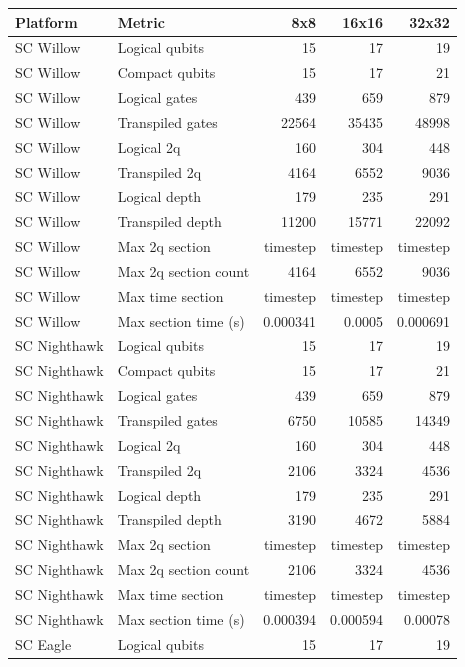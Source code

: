 \begin{table}
\centering
\scriptsize
\begin{tabular}{llrrr}
\hline
Platform & Metric & 8x8 & 16x16 & 32x32 \\
\hline
SC Willow & Logical qubits & 15 & 17 & 19 \\
SC Willow & Compact qubits & 15 & 17 & 21 \\
SC Willow & Logical gates & 439 & 659 & 879 \\
SC Willow & Transpiled gates & 22564 & 35435 & 48998 \\
SC Willow & Logical 2q & 160 & 304 & 448 \\
SC Willow & Transpiled 2q & 4164 & 6552 & 9036 \\
SC Willow & Logical depth & 179 & 235 & 291 \\
SC Willow & Transpiled depth & 11200 & 15771 & 22092 \\
SC Willow & Max 2q section & timestep & timestep & timestep \\
SC Willow & Max 2q section count & 4164 & 6552 & 9036 \\
SC Willow & Max time section & timestep & timestep & timestep \\
SC Willow & Max section time (s) & 0.000341 & 0.0005 & 0.000691 \\
\hline
SC Nighthawk & Logical qubits & 15 & 17 & 19 \\
SC Nighthawk & Compact qubits & 15 & 17 & 21 \\
SC Nighthawk & Logical gates & 439 & 659 & 879 \\
SC Nighthawk & Transpiled gates & 6750 & 10585 & 14349 \\
SC Nighthawk & Logical 2q & 160 & 304 & 448 \\
SC Nighthawk & Transpiled 2q & 2106 & 3324 & 4536 \\
SC Nighthawk & Logical depth & 179 & 235 & 291 \\
SC Nighthawk & Transpiled depth & 3190 & 4672 & 5884 \\
SC Nighthawk & Max 2q section & timestep & timestep & timestep \\
SC Nighthawk & Max 2q section count & 2106 & 3324 & 4536 \\
SC Nighthawk & Max time section & timestep & timestep & timestep \\
SC Nighthawk & Max section time (s) & 0.000394 & 0.000594 & 0.00078 \\
\hline
SC Eagle & Logical qubits & 15 & 17 & 19 \\

\end{tabular}
\end{table}
